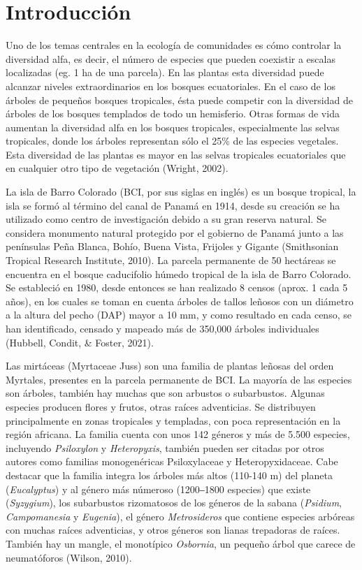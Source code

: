 \documentclass[11pt,]{article}
\begin{document}
\vskip 6.5pt


\noindent  \section{Introducción}\label{introducciuxf3n}

Uno de los temas centrales en la ecología de comunidades es cómo
controlar la diversidad alfa, es decir, el número de especies que pueden
coexistir a escalas localizadas (eg. 1 ha de una parcela). En las
plantas esta diversidad puede alcanzar niveles extraordinarios en los
bosques ecuatoriales. En el caso de los árboles de pequeños bosques
tropicales, ésta puede competir con la diversidad de árboles de los
bosques templados de todo un hemisferio. Otras formas de vida aumentan
la diversidad alfa en los bosques tropicales, especialmente las selvas
tropicales, donde los árboles representan sólo el 25\% de las especies
vegetales. Esta diversidad de las plantas es mayor en las selvas
tropicales ecuatoriales que en cualquier otro tipo de vegetación
(Wright, 2002).

La isla de Barro Colorado (BCI, por sus siglas en inglés) es un bosque
tropical, la isla se formó al término del canal de Panamá en 1914, desde
su creación se ha utilizado como centro de investigación debido a su
gran reserva natural. Se considera monumento natural protegido por el
gobierno de Panamá junto a las penínsulas Peña Blanca, Bohío, Buena
Vista, Frijoles y Gigante (Smithsonian Tropical Research Institute,
2010). La parcela permanente de 50 hectáreas se encuentra en el bosque
caducifolio húmedo tropical de la isla de Barro Colorado. Se estableció
en 1980, desde entonces se han realizado 8 censos (aprox. 1 cada 5
años), en los cuales se toman en cuenta árboles de tallos leñosos con un
diámetro a la altura del pecho (DAP) mayor a 10 mm, y como resultado en
cada censo, se han identificado, censado y mapeado más de 350,000
árboles individuales (Hubbell, Condit, \& Foster, 2021).

Las mirtáceas (Myrtaceae Juss) son una familia de plantas leñosas del
orden Myrtales, presentes en la parcela permanente de BCI. La mayoría de
las especies son árboles, también hay muchas que son arbustos o
subarbustos. Algunas especies producen flores y frutos, otras raíces
adventicias. Se distribuyen principalmente en zonas tropicales y
templadas, con poca representación en la región africana. La familia
cuenta con unos 142 géneros y más de 5.500 especies, incluyendo
\emph{Psiloxylon} y \emph{Heteropyxis}, también pueden ser citadas por
otros autores como familias monogenéricas Psiloxylaceae y
Heteropyxidaceae. Cabe destacar que la familia integra los árboles más
altos (110-140 m) del planeta (\emph{Eucalyptus}) y al género más
númeroso (1200‒1800 especies) que existe (\emph{Syzygium}), los
subarbustos rizomatosos de los géneros de la sabana (\emph{Psidium},
\emph{Campomanesia} y \emph{Eugenia}), el género \emph{Metrosideros} que
contiene especies arbóreas con muchas raíces adventicias, y otros
géneros son lianas trepadoras de raíces. También hay un mangle, el
monotípico \emph{Osbornia}, un pequeño árbol que carece de neumatóforos
(Wilson, 2010).
\end{document}
